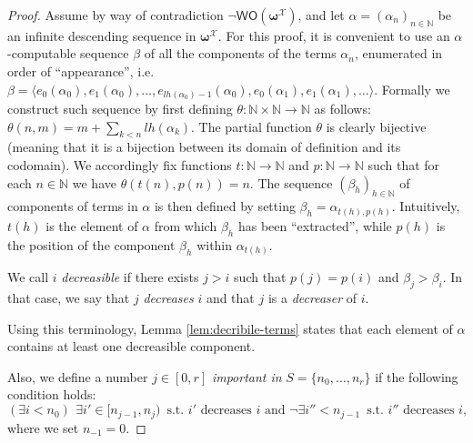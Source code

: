 \documentclass{amsart}
\newcommand\Nat{\mathbb{N}}
\newcommand\WO{\mathsf{WO}}
\newcommand{\LoX}{\mathcal{X}}
\newcommand\boldomega{\pmb{\omega}}
\begin{document}
\begin{proof}
Assume by way of contradiction $\neg\WO(\boldomega^\LoX)$, and let $\alpha= (\alpha_n)_{n\in \Nat}$ 
be an infinite descending sequence in $\boldomega^\LoX$. 
For this proof, it is convenient to use an $\alpha$-computable sequence $\beta$ of all the components of the terms $\alpha_n$, enumerated in order of ``appearance'', i.e. $\beta = \langle e_0(\alpha_0), e_1(\alpha_0), \dots, e_{lh(\alpha_0)-1}(\alpha_0), e_0(\alpha_1), e_1(\alpha_1), \dots \rangle$. Formally we construct such sequence by first defining $\theta : \Nat\times\Nat\to \Nat$ as follows: $\theta(n,m)= m + \sum_{k < n} lh(\alpha_k)$. The partial function $\theta$ is clearly bijective (meaning that it is a bijection between its domain of definition and its codomain). We accordingly fix functions $t: \Nat \to \Nat$ and $p:\Nat\to\Nat$ such that for each $n\in\Nat$ we have
$\theta(t(n),p(n))=n$. The sequence $(\beta_h)_{h\in\Nat}$ of components of terms in $\alpha$ is then defined
by setting $\beta_h = \alpha_{t(h),p(h)}$. Intuitively, $t(h)$ is the element of $\alpha$ from which $\beta_h$ has been ``extracted'', while $p(h)$ is the position of the component $\beta_h$ within $\alpha_{t(h)}$.


We call $i$ \emph{decreasible} if there exists $j>i$ such that $p(j)=p(i)$ and $\beta_j > \beta_i$. In that case, we say that $j$ \emph{decreases} $i$ and that $j$ is a \emph{decreaser} of $i$. 

Using this terminology, Lemma \ref{lem:decribile-terms} states that each element of $\alpha$ contains at least one decreasible component.

Also, we define a number $j\in [0,r]$ \textit{important in} $S=\{n_0, \ldots,n_r\}$ if the following condition holds:
$$
(\exists i< n_0)\ \,\exists i' \in [n_{j-1}, n_j)\, \text{ s.t. } i' \text{ decreases } i \text{  and } \neg\exists i'' < n_{j-1}\, \text{  s.t. } i'' \text{  decreases } i,$$
where we set  $n_{-1}=0$.
\medskip


\end{proof}
\end{document}
